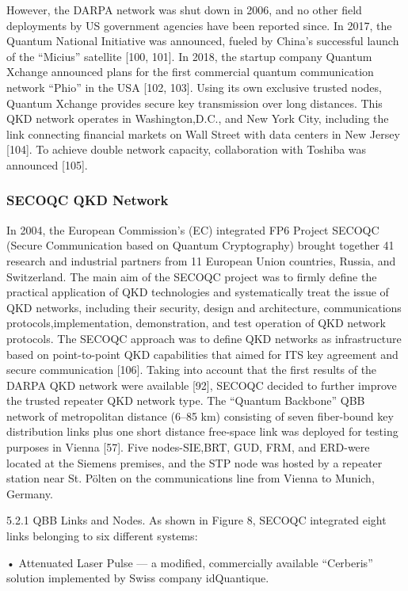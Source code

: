 However, the DARPA network was shut down in 2006, and no other field deployments by US government agencies have been reported since. In 2017, the Quantum National Initiative was announced, fueled by China’s successful launch of the “Micius” satellite [100, 101]. In 2018, the startup company Quantum Xchange announced plans for the first commercial quantum communication network “Phio” in the USA [102, 103]. Using its own exclusive trusted nodes, Quantum Xchange provides secure key transmission over long distances. This QKD network operates in Washington,D.C., and New York City, including the link connecting financial markets on Wall Street with data centers in New Jersey [104]. To achieve double network capacity, collaboration with Toshiba was announced [105].

\subsubsection*{SECOQC QKD Network}
In 2004, the European Commission’s (EC) integrated FP6 Project SECOQC (Secure Communication based on Quantum Cryptography) brought together 41 research and industrial partners from 11 European Union countries, Russia, and Switzerland. The main aim of the SECOQC project was to firmly define the practical application of QKD technologies and systematically treat the issue of QKD networks, including their security, design and architecture, communications protocols,implementation, demonstration, and test operation of QKD network protocols.
The SECOQC approach was to define QKD networks as infrastructure based on point-to-point QKD capabilities that aimed for ITS key agreement and secure communication [106]. Taking into account that the first results of the DARPA QKD network were available [92], SECOQC decided to further improve the trusted repeater QKD network type. The “Quantum Backbone” QBB network of metropolitan distance (6–85 km) consisting of seven fiber-bound key distribution links plus one short distance free-space link was deployed for testing purposes in Vienna [57]. Five nodes-SIE,BRT, GUD, FRM, and ERD-were located at the Siemens premises, and the STP node was hosted by a repeater station near St. Pölten on the communications line from Vienna to Munich, Germany.

5.2.1 QBB Links and Nodes. As shown in Figure 8, SECOQC integrated eight links belonging to six different systems:

• Attenuated Laser Pulse — a modified, commercially available “Cerberis” solution implemented by Swiss company idQuantique.

